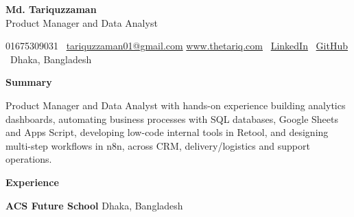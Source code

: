 \documentclass[11pt]{article}
\begin{document}
\begin{center}
    \textbf{\Large Md. Tariquzzaman}\\
    Product Manager and Data Analyst\\
    \hrulefill
\end{center}

\begin{center}
    01675309031 \textbullet \ \href{mailto:tariquzzaman01@gmail.com}{tariquzzaman01@gmail.com} \textbullet \href{https://www.thetariq.com/}{www.thetariq.com} \textbullet \ \href{https://www.linkedin.com/in/tariquzzaman01/}{LinkedIn} \textbullet \ \href{https://github.com/Tariq-15}{GitHub} \textbullet \ Dhaka, Bangladesh
\end{center}

\vspace{4pt}

\begin{center}
    \textbf{Summary}
\end{center}

Product Manager and Data Analyst with hands-on experience building analytics dashboards, automating business processes with SQL databases, Google Sheets and Apps Script, developing low-code internal tools in Retool, and designing multi-step workflows in n8n, across CRM, delivery/logistics and support operations.

\vspace{4pt}

\begin{center}
    \textbf{Experience}
\end{center}

\textbf{ACS Future School} \hfill Dhaka, Bangladesh
\end{document}
